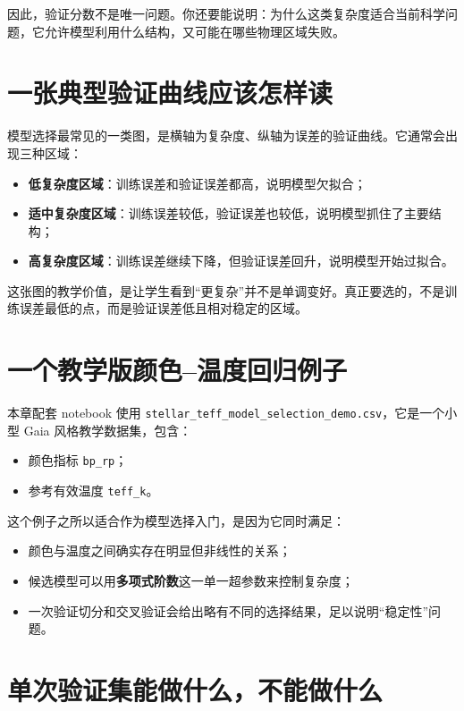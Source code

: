 因此，验证分数不是唯一问题。你还要能说明：为什么这类复杂度适合当前科学问题，它允许模型利用什么结构，又可能在哪些物理区域失败。

\section{一张典型验证曲线应该怎样读}

模型选择最常见的一类图，是横轴为复杂度、纵轴为误差的验证曲线。它通常会出现三种区域：

\begin{itemize}
    \item \textbf{低复杂度区域}：训练误差和验证误差都高，说明模型欠拟合；
    \item \textbf{适中复杂度区域}：训练误差较低，验证误差也较低，说明模型抓住了主要结构；
    \item \textbf{高复杂度区域}：训练误差继续下降，但验证误差回升，说明模型开始过拟合。
\end{itemize}

这张图的教学价值，是让学生看到“更复杂”并不是单调变好。真正要选的，不是训练误差最低的点，而是验证误差低且相对稳定的区域。

\section{一个教学版颜色--温度回归例子}

本章配套 notebook 使用 \nolinkurl{stellar_teff_model_selection_demo.csv}，它是一个小型 Gaia 风格教学数据集，包含：

\begin{itemize}
    \item 颜色指标 \texttt{bp\_rp}；
    \item 参考有效温度 \texttt{teff\_k}。
\end{itemize}

这个例子之所以适合作为模型选择入门，是因为它同时满足：

\begin{itemize}
    \item 颜色与温度之间确实存在明显但非线性的关系；
    \item 候选模型可以用\textbf{多项式阶数}这一单一超参数来控制复杂度；
    \item 一次验证切分和交叉验证会给出略有不同的选择结果，足以说明“稳定性”问题。
\end{itemize}

\section{单次验证集能做什么，不能做什么}

